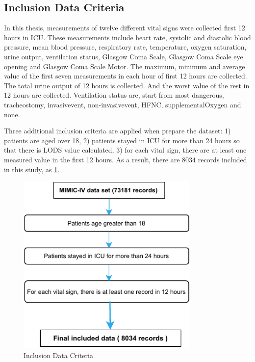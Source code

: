 \documentclass[12pt,a4paper,english
]{tunithesis}
\begin{document}
\subsection{Inclusion Data Criteria}
In this thesis, measurements of  twelve different vital signs were collected first 12 hours in ICU. These measurements include heart rate, systolic and diastolic blood pressure, mean blood pressure, respiratory rate, temperature, oxygen saturation, urine output, ventilation status, Glasgow Coma Scale, Glasgow Coma Scale eye opening and Glasgow Coma Scale Motor. The maximum, minimum and average value of the first seven measurements in each hour of first 12 hours are collected. The total urine output of 12 hours is collected. And the worst value of the rest in 12 hours are collected. Ventilation status are, start from most dangerous, tracheostomy, invasivevent, non-invasivevent, HFNC, supplementalOxygen and none.

Three additional inclusion criteria are applied when prepare the dataset: 1) patients are aged over 18, 2) patients stayed in ICU for more than 24 hours so that there is LODS value calculated, 3) for each vital sign, there are at least one measured value in the first 12 hours. As a result, there are 8034 records included in this study, as \ref{fig:include_criteria}.

\begin{figure}
  \begin{center}
    \includegraphics[width=0.8\textwidth]{thesis/img/include_criteria.pdf}
  \end{center}
  \caption[Inclusion Criteria]{Inclusion Data Criteria}
  \label{fig:include_criteria}
\end{figure}
\end{document}
